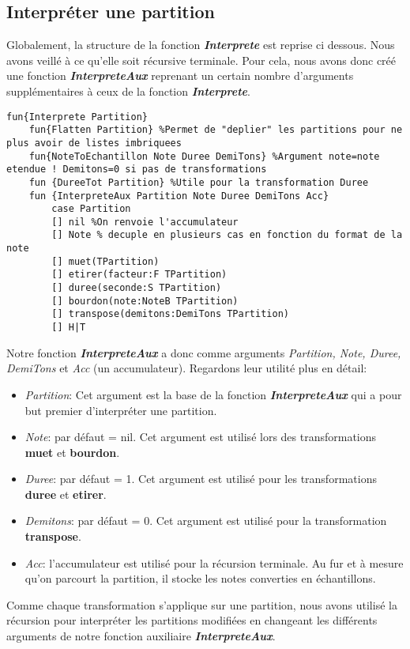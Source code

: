 \documentclass[a4paper,12pt]{report}
\begin{document}
\subsection*{Interpréter une partition}
Globalement, la structure de la fonction \textit{\textbf{Interprete}} est reprise ci dessous. Nous avons veillé à ce qu'elle soit récursive terminale. Pour cela, nous avons donc créé une fonction \textit{\textbf{InterpreteAux}} reprenant un certain nombre d'arguments supplémentaires à ceux de la fonction \textit{\textbf{Interprete}}. 
\begin{lstlisting}[frame=single] 
fun{Interprete Partition}
	fun{Flatten Partition} %Permet de "deplier" les partitions pour ne plus avoir de listes imbriquees
	fun{NoteToEchantillon Note Duree DemiTons} %Argument note=note etendue ! Demitons=0 si pas de transformations
	fun {DureeTot Partition} %Utile pour la transformation Duree 
	fun {InterpreteAux Partition Note Duree DemiTons Acc}
		case Partition
		[] nil %On renvoie l'accumulateur
		[] Note % decuple en plusieurs cas en fonction du format de la note
		[] muet(TPartition)
		[] etirer(facteur:F TPartition)
		[] duree(seconde:S TPartition)
		[] bourdon(note:NoteB TPartition)
		[] transpose(demitons:DemiTons TPartition)
		[] H|T			
\end{lstlisting}
Notre fonction \textit{\textbf{InterpreteAux}} a donc comme arguments \textit{Partition, Note, Duree, DemiTons} et \textit{Acc} (un accumulateur). Regardons leur utilité plus en détail:
\begin{itemize}
\item \textit{Partition}: Cet argument est la base de la fonction \textit{\textbf{InterpreteAux}} qui a pour but premier d’interpréter une partition. 
\item \textit{Note}: par défaut = nil. Cet argument est utilisé lors des transformations \textbf{muet} et \textbf{bourdon}.
\item \textit{Duree}: par défaut = 1. Cet argument est utilisé pour les transformations \textbf{duree} et \textbf{etirer}.
\item \textit{Demitons}: par défaut = 0. Cet argument est utilisé pour la transformation \textbf{transpose}.
\item \textit{Acc}: l'accumulateur est utilisé pour la récursion terminale. Au fur et à mesure qu'on parcourt la partition, il stocke les notes converties en échantillons.
\end{itemize}
	Comme chaque transformation s'applique sur une partition, nous avons utilisé la récursion pour interpréter les partitions modifiées en changeant les différents arguments de notre fonction auxiliaire \textit{\textbf {InterpreteAux}}. 
\end{document}
